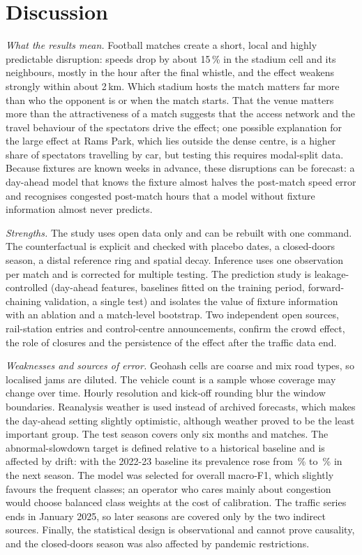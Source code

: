 \documentclass[conference]{IEEEtran}
\begin{document}
\section{Discussion}
\label{sec:discussion}
\textit{What the results mean.} Football matches create a short, local and highly predictable disruption: speeds drop by about 15\,\% in the stadium cell and its neighbours, mostly in the hour after the final whistle, and the effect weakens strongly within about 2\,km. Which stadium hosts the match matters far more than who the opponent is or when the match starts. That the venue matters more than the attractiveness of a match suggests that the access network and the travel behaviour of the spectators drive the effect; one possible explanation for the large effect at Rams Park, which lies outside the dense centre, is a higher share of spectators travelling by car, but testing this requires modal-split data. Because fixtures are known weeks in advance, these disruptions can be forecast: a day-ahead model that knows the fixture almost halves the post-match speed error and recognises congested post-match hours that a model without fixture information almost never predicts.

\textit{Strengths.} The study uses open data only and can be rebuilt with one command. The counterfactual is explicit and checked with placebo dates, a closed-doors season, a distal reference ring and spatial decay. Inference uses one observation per match and is corrected for multiple testing. The prediction study is leakage-controlled (day-ahead features, baselines fitted on the training period, forward-chaining validation, a single test) and isolates the value of fixture information with an ablation and a match-level bootstrap. Two independent open sources, rail-station entries and control-centre announcements, confirm the crowd effect, the role of closures and the persistence of the effect after the traffic data end.

\textit{Weaknesses and sources of error.} Geohash cells are coarse and mix road types, so localised jams are diluted. The vehicle count is a sample whose coverage may change over time. Hourly resolution and kick-off rounding blur the window boundaries. Reanalysis weather is used instead of archived forecasts, which makes the day-ahead setting slightly optimistic, although weather proved to be the least important group. The test season covers only six months and \vTestMatches matches. The abnormal-slowdown target is defined relative to a historical baseline and is affected by drift: with the 2022-23 baseline its prevalence rose from \vTThreePrevSelTrain\,\% to \vTThreePrevSelVal\,\% in the next season. The model was selected for overall macro-F1, which slightly favours the frequent classes; an operator who cares mainly about congestion would choose balanced class weights at the cost of calibration. The traffic series ends in January 2025, so later seasons are covered only by the two indirect sources. Finally, the statistical design is observational and cannot prove causality, and the closed-doors season was also affected by pandemic restrictions.
\end{document}
